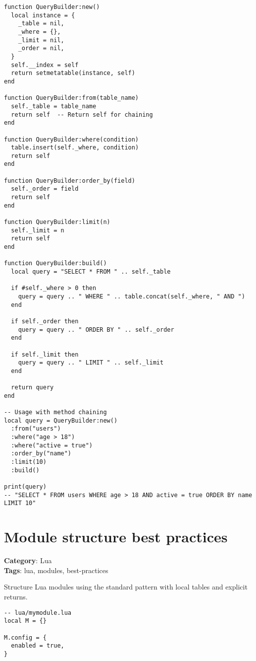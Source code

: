 {{{{{{\begin{Exa*}{}
\begin{Verbatim}[fontsize=\footnotesize, breaklines, breakanywhere]
function QueryBuilder:new()
  local instance = {
    _table = nil,
    _where = {},
    _limit = nil,
    _order = nil,
  }
  self.__index = self
  return setmetatable(instance, self)
end

function QueryBuilder:from(table_name)
  self._table = table_name
  return self  -- Return self for chaining
end

function QueryBuilder:where(condition)
  table.insert(self._where, condition)
  return self
end

function QueryBuilder:order_by(field)
  self._order = field
  return self
end

function QueryBuilder:limit(n)
  self._limit = n
  return self
end

function QueryBuilder:build()
  local query = "SELECT * FROM " .. self._table

  if #self._where > 0 then
    query = query .. " WHERE " .. table.concat(self._where, " AND ")
  end

  if self._order then
    query = query .. " ORDER BY " .. self._order
  end

  if self._limit then
    query = query .. " LIMIT " .. self._limit
  end

  return query
end

-- Usage with method chaining
local query = QueryBuilder:new()
  :from("users")
  :where("age > 18")
  :where("active = true")
  :order_by("name")
  :limit(10)
  :build()

print(query)
-- "SELECT * FROM users WHERE age > 18 AND active = true ORDER BY name LIMIT 10"
\end{Verbatim}
\end{Exa*}

\section{Module structure best practices}

\textbf{Category}: Lua\\ \textbf{Tags}: lua, modules, best-practices
\vspace{0.5cm}

Structure Lua modules using the standard pattern with local tables and explicit returns.

\begin{Exa*}{}
\begin{Verbatim}[fontsize=\footnotesize, breaklines, breakanywhere]
-- lua/mymodule.lua
local M = {}

M.config = {
  enabled = true,
}


\end{Verbatim}
\end{Exa*}}}}}}}
